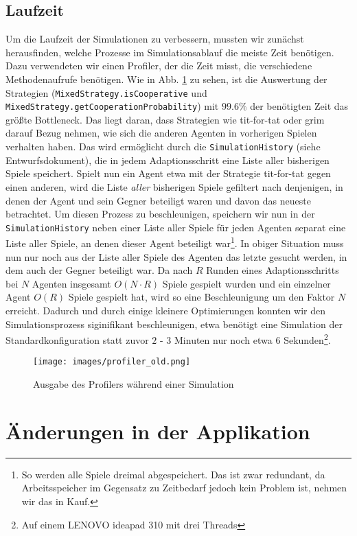 \documentclass[parskip=full,11pt,openany]{scrreprt}
\begin{document}
\subsection{Laufzeit}
Um die Laufzeit der Simulationen zu verbessern, mussten wir zunächst herausfinden, welche Prozesse im Simulationsablauf die meiste Zeit benötigen. Dazu verwendeten wir einen Profiler, der die Zeit misst, die verschiedene Methodenaufrufe benötigen. Wie in Abb. \ref{profiler_old} zu sehen, ist die Auswertung der Strategien (\texttt{MixedStrategy.isCooperative} und \texttt{MixedStrategy.getCooperationProbability}) mit \(99.6\%\) der benötigten Zeit das größte Bottleneck. Das liegt daran, dass Strategien wie tit-for-tat oder grim darauf Bezug nehmen, wie sich die anderen Agenten in vorherigen Spielen verhalten haben. Das wird ermöglicht durch die \texttt{SimulationHistory} (siehe Entwurfsdokument), die in jedem Adaptionsschritt eine Liste aller bisherigen Spiele speichert. Spielt nun ein Agent etwa mit der Strategie tit-for-tat gegen einen anderen, wird die Liste \textit{aller} bisherigen Spiele gefiltert nach denjenigen, in denen der Agent und sein Gegner beteiligt waren und davon das neueste betrachtet. Um diesen Prozess zu beschleunigen, speichern wir nun in der \texttt{SimulationHistory} neben einer Liste aller Spiele für jeden Agenten separat eine Liste aller Spiele, an denen dieser Agent beteiligt war\footnote{So werden alle Spiele dreimal abgespeichert. Das ist zwar redundant, da Arbeitsspeicher im Gegensatz zu Zeitbedarf jedoch kein Problem ist, nehmen wir das in Kauf.}. In obiger Situation muss nun nur noch aus der Liste aller Spiele des Agenten das letzte gesucht werden, in dem auch der Gegner beteiligt war. Da nach \(R\) Runden eines Adaptionsschritts bei \(N\) Agenten insgesamt \(O(N\cdot R)\) Spiele gespielt wurden und ein einzelner Agent \(O(R)\) Spiele gespielt hat, wird so eine Beschleunigung um den Faktor \(N\) erreicht. Dadurch und durch einige kleinere Optimierungen konnten wir den Simulationsprozess siginifikant beschleunigen, etwa benötigt eine Simulation der Standardkonfiguration statt zuvor \(2\) - \(3\) Minuten nur noch etwa \(6\) Sekunden\footnote{Auf einem LENOVO ideapad 310 mit drei Threads}.

\begin{figure}
	\centering
	\texttt{[image: images/profiler\_old.png]}
	\caption{Ausgabe des Profilers während einer Simulation}
	\label{profiler_old}
\end{figure}


\section{Änderungen in der Applikation}
\end{document}
